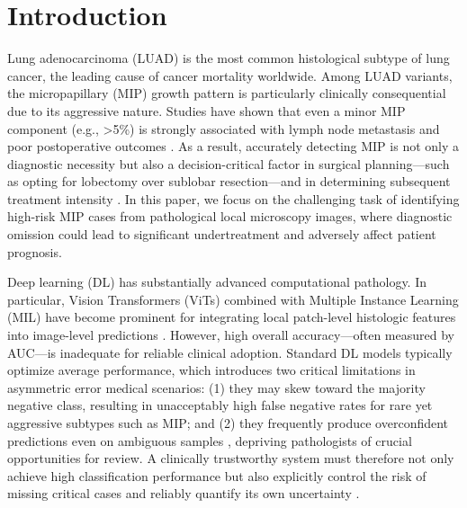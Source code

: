 \documentclass[journal]{IEEEtran}
\theoremstyle{remark}
\begin{document}
%
\section{Introduction}

Lung adenocarcinoma (LUAD) is the most common histological subtype of lung cancer, the leading cause of cancer mortality worldwide. Among LUAD variants, the micropapillary (MIP) growth pattern is particularly clinically consequential due to its aggressive nature. Studies have shown that even a minor MIP component (e.g., >5\%) is strongly associated with lymph node metastasis and poor postoperative outcomes \cite{caso2020underlying, dai2017tumor}. As a result, accurately detecting MIP is not only a diagnostic necessity but also a decision-critical factor in surgical planning—such as opting for lobectomy over sublobar resection—and in determining subsequent treatment intensity \cite{dai2017tumor}. In this paper, we focus on the challenging task of identifying high-risk MIP cases from pathological local microscopy images, where diagnostic omission could lead to significant undertreatment and adversely affect patient prognosis.


Deep learning (DL) has substantially advanced computational pathology. In particular, Vision Transformers (ViTs) \cite{dosovitskiy2020image} combined with Multiple Instance Learning (MIL) \cite{ilse2018attention} have become prominent for integrating local patch-level histologic features into image-level predictions \cite{campanella2019clinical, lu2021data, ilse2018attention}. However, high overall accuracy—often measured by AUC—is inadequate for reliable clinical adoption. Standard DL models typically optimize average performance, which introduces two critical limitations in asymmetric error medical scenarios: (1) they may skew toward the majority negative class, resulting in unacceptably high false negative rates for rare yet aggressive subtypes such as MIP; and (2) they frequently produce overconfident predictions even on ambiguous samples \cite{hendrycks2016baseline}, depriving pathologists of crucial opportunities for review. A clinically trustworthy system must therefore not only achieve high classification performance but also explicitly control the risk of missing critical cases and reliably quantify its own uncertainty \cite{dvijotham2023enhancing}.
\end{document}

